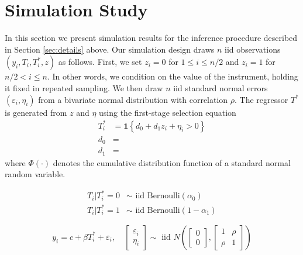 \section{Simulation Study}

In this section we present simulation results for the inference procedure described in Section \ref{sec:details} above.
Our simulation design draws $n$ iid observations $(y_i, T_i, T_i^*, z)$ as follows.
First, we set $z_i = 0$ for $1 \leq i \leq n/2$ and $z_i = 1$ for $n/2 < i \leq n$.
In other words, we condition on the value of the instrument, holding it fixed in repeated sampling.
We then draw $n$ iid standard normal errors $(\varepsilon_i, \eta_i)$ from a bivariate normal distribution with correlation $\rho$.
The regressor $T^*$ is generated from $z$ and $\eta$ using the first-stage selection equation
\begin{align}
  T^*_i &= \mathbf{1}\left\{ d_0 + d_1 z_i + \eta_i > 0 \right\} \\
  d_0 &= \\
  d_1 &= 
\end{align}
where $\Phi(\cdot)$ denotes the cumulative distribution function of a standard normal random variable.

\begin{align}
  T_i|T^*_i=0 &\sim \mbox{ iid Bernoulli}(\alpha_0)\\
  T_i|T^*_i=1 &\sim \mbox{ iid Bernoulli}(1 - \alpha_1)
\end{align}

\begin{equation}
  y_i = c + \beta T^*_i + \varepsilon_i, \quad 
  \left[
  \begin{array}{c}
   \varepsilon_i \\ \eta_i 
  \end{array}
\right] \sim \mbox{ iid } N\left( \left[
\begin{array}{c}
  0 \\ 0
\end{array}
\right], \left[
\begin{array}{cc}
  1 & \rho \\
  \rho & 1
\end{array}
\right]\right)
\end{equation}

